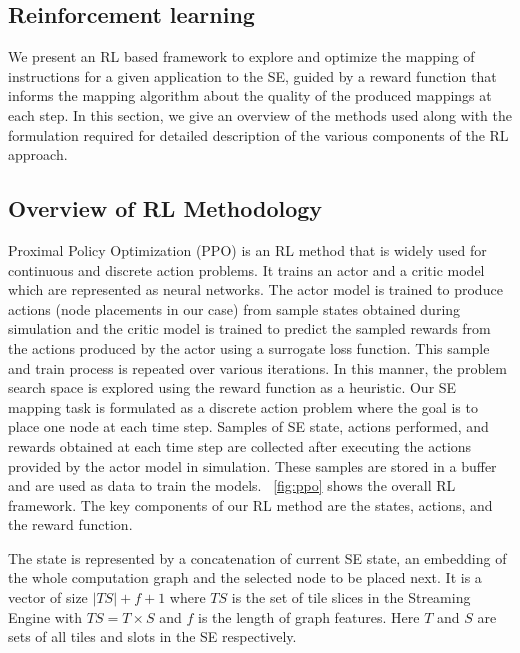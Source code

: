\subsection{Reinforcement learning}

We present an RL based framework to explore and optimize the mapping of instructions for a given application to the SE, guided by a reward function that informs the mapping algorithm about the quality of the produced mappings at each step. In this section, we give an overview of the methods used along with the formulation required for detailed description of the various components of the RL approach.

\subsection{Overview of RL Methodology}
Proximal Policy Optimization (PPO) \cite{schulman2017proximal} is an RL method that is widely used for continuous and discrete action problems. 
It trains an actor and a critic model which are represented as neural networks. 
The actor model is trained to produce actions (node placements in our case) from sample states obtained during simulation and the critic model is trained to predict the sampled rewards from the actions produced by the actor using a surrogate loss function. 
This sample and train process is repeated over various iterations. In this manner, the problem search space is explored using the reward function as a heuristic. 
Our SE mapping task is formulated as a discrete action problem where the goal is to place one node at each time step. 
Samples of SE state, actions performed, and rewards obtained at each time step are collected after executing the actions provided by the actor model in simulation. 
These samples are stored in a buffer and are used as data to train the models. \figurename~\ref{fig:ppo} shows the overall RL framework. 
The key components of our RL method are the states, actions, and the reward function.

The state is represented by a concatenation of current SE state, an embedding of the whole computation graph and the selected node to be placed next. 
It is a vector of size $|TS| + f + 1$ where $TS$ is the set of tile slices in the Streaming Engine with $TS=T \times S$ and $f$ is the length of graph features. 
Here $T$ and $S$ are sets of all tiles and slots in the SE respectively.

